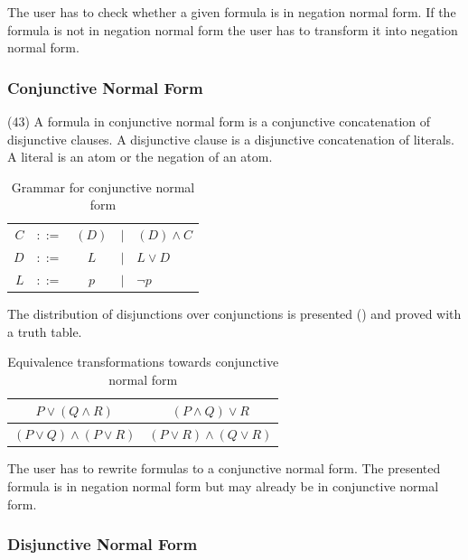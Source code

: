 The user has to check whether a given formula is in negation normal form.
If the formula is not in negation normal form
the user has to transform it into negation normal form.

\subsubsection{Conjunctive Normal Form}
\label{tut:43}

(43) A formula in conjunctive normal form is a conjunctive concatenation of disjunctive clauses.
A disjunctive clause is a disjunctive concatenation of literals. 
A literal is an atom or the negation of an atom. 

\begin{table}[htdp]
\begin{center}
\begin{tabular}{rcccl}
$C$	&$::=$ & $(D)$ 	&$|$ & $(D) \wedge C$\\
$D$	&$::=$ & $L$ 	&$|$ & $L \vee D$\\
$L$	&$::=$ & $p$ 	&$|$ & $\neg p$ 
\end{tabular}
\caption{Grammar for conjunctive normal form}
\label{tab:CNF}
\end{center}
\end{table}

The distribution of disjunctions over conjunctions is presented ()
and proved with a truth table.

\begin{table}[htdp]
\begin{center}
\begin{tabular}{cc}
$P \vee (Q \wedge R)$ & $(P \wedge Q) \vee R$\\
\hline
$(P\vee Q) \wedge (P\vee R)$ & $(P\vee R) \wedge (Q\vee R)$
\end{tabular}
\caption{Equivalence transformations towards conjunctive normal form}
\label{tab:ET_CNF}
\end{center}
\end{table}

The user has to rewrite formulas to a conjunctive normal form.  
The presented formula is in negation normal form 
but may already be in conjunctive normal form.


\subsubsection{Disjunctive Normal Form}
\label{tut:44}

